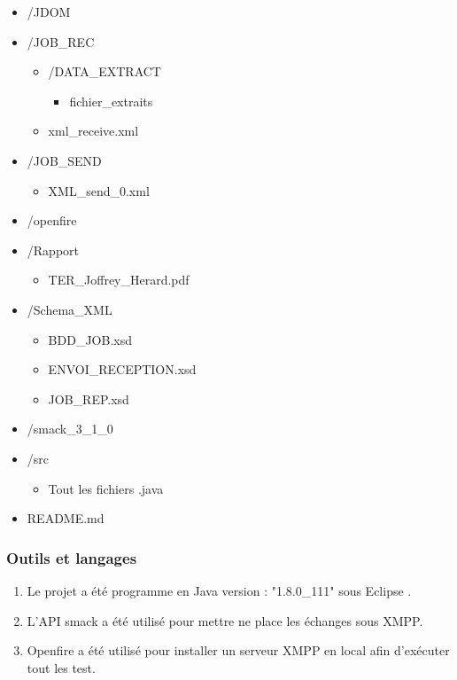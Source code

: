 \documentclass[11pt]{article}
\begin{document}
\begin{itemize}
\begin{itemize}
		\item /JDOM  
		\item /JOB\_REC \begin{itemize}\item /DATA\_EXTRACT \begin{itemize} \item fichier\_extraits\end{itemize}\item xml\_receive.xml  \end{itemize}
		\item /JOB\_SEND \begin{itemize}\item XML\_send\_0.xml \end{itemize}
		\item /openfire
		\item /Rapport \begin{itemize}\item TER\_Joffrey\_Herard.pdf  \end{itemize} 
		\item /Schema\_XML \begin{itemize}\item BDD\_JOB.xsd \item ENVOI\_RECEPTION.xsd \item JOB\_REP.xsd \end{itemize}
		\item /smack\_3\_1\_0
		\item /src \begin{itemize}\item Tout les fichiers .java \end{itemize}
		\item README.md 
\end{itemize}

\end{itemize}
\newpage
\subsubsection{Outils et langages} 
\begin{enumerate}
\item Le projet a été programme en Java version : "1.8.0\_111" sous Eclipse  .
\item L'API smack a été utilisé pour mettre ne place les échanges sous XMPP.
\item Openfire a été utilisé pour installer un serveur XMPP en local afin d'exécuter tout les test.
\end{enumerate}
\newpage
\end{document}
